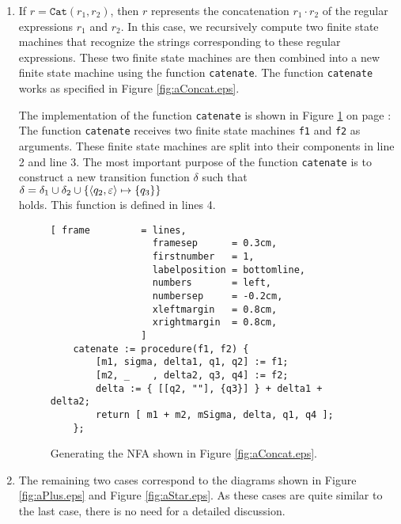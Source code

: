 \begin{enumerate}
\item If $r = \texttt{Cat}(r_1,r_2)$, then $r$ represents the concatenation $r_1 \cdot r_2$ of the regular
      expressions $r_1$ and $r_2$. In this case,  we recursively compute two 
      finite state machines
      that recognize the strings corresponding to these regular expressions.
      These two finite state machines are then combined into a
      new finite state machine using the function \texttt{catenate}.  The function \texttt{catenate}
      works as specified in Figure \ref{fig:aConcat.eps}.

      The implementation of the function \texttt{catenate} is shown in Figure
      \ref{fig:regexp-2-nfa.stlx:catenate} on page \pageref{fig:regexp-2-nfa.stlx:catenate}:
      The function \texttt{catenate} receives two finite state machines \texttt{f1} and \texttt{f2}
      as arguments.  These finite state machines are split into their components in line 2 and line
      3.       
      The most important purpose of the function \texttt{catenate} is to construct a new transition 
      function $\delta$ such that 
      \\[0.2cm]
      \hspace*{1.3cm}
      $\delta = \delta_1 \cup \delta_2 \cup \{ \pair(q_2, \varepsilon) \mapsto \{ q_3 \} \}$
      \\[0.2cm]
      holds.  This function is defined in lines 4.


\begin{figure}[!ht]
\centering
\begin{Verbatim}[ frame         = lines, 
                  framesep      = 0.3cm, 
                  firstnumber   = 1,
                  labelposition = bottomline,
                  numbers       = left,
                  numbersep     = -0.2cm,
                  xleftmargin   = 0.8cm,
                  xrightmargin  = 0.8cm,
                ]
    catenate := procedure(f1, f2) {
        [m1, sigma, delta1, q1, q2] := f1;
        [m2, _    , delta2, q3, q4] := f2;
        delta := { [[q2, ""], {q3}] } + delta1 + delta2; 
        return [ m1 + m2, mSigma, delta, q1, q4 ];
    };
\end{Verbatim}
\vspace*{-0.3cm}
\caption{Generating the NFA shown in Figure \ref{fig:aConcat.eps}.}
\label{fig:regexp-2-nfa.stlx:catenate}
\end{figure}

\item The remaining two cases correspond to the diagrams shown in Figure \ref{fig:aPlus.eps} and
      Figure \ref{fig:aStar.eps}.  As these cases are quite similar to the last case, there is
      no need for a detailed discussion.


\end{enumerate}
